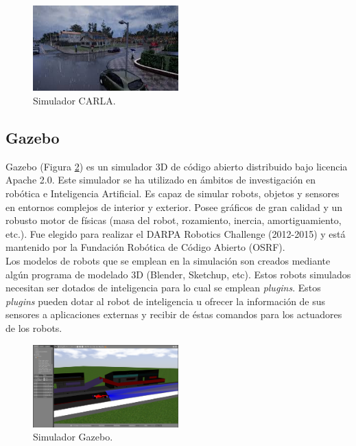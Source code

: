 \begin{figure}
\begin{center}
	\includegraphics[width=0.5\textwidth]{figures/Estado_arte/carla.jpeg}
   \caption{Simulador CARLA.}
	\label{fig.carla}
\end{center}
\end{figure}


\subsection{Gazebo}

Gazebo \cite{gazebo1} (Figura \ref{fig.gazebo}) es un simulador 3D de código abierto distribuido bajo licencia Apache 2.0. Este simulador se ha utilizado en ámbitos de investigación en robótica e Inteligencia Artificial. Es capaz de simular robots, objetos y sensores en entornos complejos de interior y exterior. Posee gráficos de gran calidad y un robusto motor de físicas (masa del robot, rozamiento, inercia, amortiguamiento, etc.). Fue elegido para realizar el DARPA Robotics Challenge (2012-2015) y está mantenido por la Fundación Robótica de Código Abierto (OSRF).\\

Los modelos de robots que se emplean en la simulación son creados mediante algún programa de modelado 3D (Blender, Sketchup, etc). Estos robots simulados necesitan ser dotados de inteligencia para lo cual se emplean \textit{plugins}. Estos \textit{plugins} pueden dotar al robot de inteligencia u ofrecer la información de sus sensores a aplicaciones externas y recibir de éstas comandos para los actuadores de los robots.

\begin{figure}
\begin{center}
	\includegraphics[width=0.5\textwidth]{figures/Estado_arte/gazebo.png}
   \caption{Simulador Gazebo.}
	\label{fig.gazebo}
\end{center}
\end{figure}


